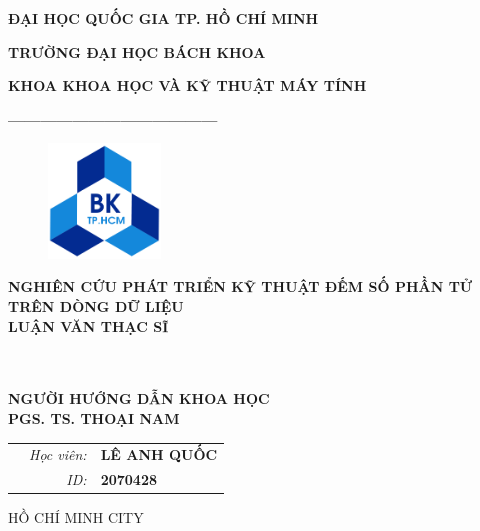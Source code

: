 \documentclass[letterpaper,13pt]{article}
\theoremstyle{mytheor}
\begin{document}
\begin{titlepage}
\begin{center} {\textbf{ĐẠI HỌC QUỐC GIA TP. HỒ CHÍ MINH}
}

{\textbf{TRƯỜNG ĐẠI HỌC BÁCH KHOA}
}

{\textbf{KHOA KHOA HỌC VÀ KỸ THUẬT MÁY TÍNH }
}

{\textbf{---------------------------------------}}

\end{center}

\vspace{1cm}

\begin{figure}[h!]
\begin{center}
\includegraphics[width=3cm]{hcmut.png}
\end{center}
\end{figure}

\vspace{2cm}


\begin{center}
\textbf{\Large NGHIÊN CỨU PHÁT TRIỂN KỸ THUẬT ĐẾM SỐ PHẦN TỬ \\TRÊN DÒNG DỮ LIỆU}
\vspace{2cm}
\\
\textbf{\Large LUẬN VĂN THẠC SĨ}

\vspace{0.5cm}

\vspace{0.5cm}
\\
\vspace{1cm}
\\
\textbf{\small NGƯỜI HƯỚNG DẪN KHOA HỌC }
~~\\
\textbf{\small PGS. TS. THOẠI NAM}


\end{center}

\vspace{1cm}

\begin{table}[h]
\begin{tabular}{rrl}
\hspace{5.6cm} 
&\textit{Học viên: } & \textbf{LÊ ANH QUỐC}\\
&\textit{ID: } & \textbf{2070428}\\

\end{tabular}
\end{table}
\vspace{1cm}
\begin{center}
{\footnotesize HỒ CHÍ MINH CITY}
\end{center}
\end{titlepage}
\end{document}
